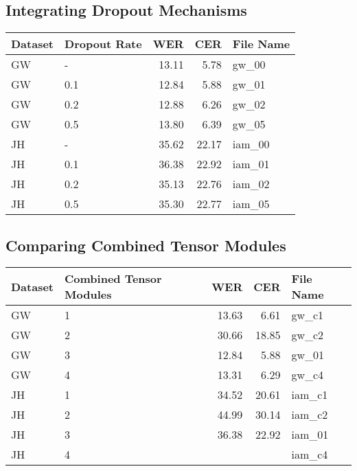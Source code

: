 \subsection{Integrating Dropout Mechanisms}
\label{subsec:5_integrating_dropout_mechanisms}
\begin{tabular}{l|l||r|r|l}
    Dataset	& Dropout Rate	& WER	& CER	& File Name	\\
    \hline
    \hline
    GW		& -		        & 13.11	& 5.78	& gw\_00 \\
    GW		& 0.1	    	& 12.84 & 5.88  & gw\_01 \\
    GW		& 0.2	        & 12.88 & 6.26	& gw\_02 \\
    GW		& 0.5	        & 13.80 & 6.39	& gw\_05 \\
    \hline
    JH		& -		        & 35.62 & 22.17 & iam\_00 \\
    JH		& 0.1		    & 36.38 & 22.92 & iam\_01 \\
    JH		& 0.2	        & 35.13 & 22.76 & iam\_02 \\
    JH		& 0.5	        & 35.30 & 22.77 & iam\_05 \\
    \end{tabular}
\subsection{Comparing Combined Tensor Modules}
\label{subsec:5_comparing_combined_tensor_modules}
\begin{tabular}{l|l||r|r|l}
    Dataset	& Combined Tensor Modules & WER	   & CER   & File Name	\\
    \hline
    \hline
    GW		& 1	                      & 13.63  & 6.61  & gw\_c1 \\
    GW		& 2	                      & 30.66  & 18.85 & gw\_c2 \\
    GW		& 3	                      & 12.84  & 5.88  & gw\_01 \\
    GW		& 4	                      & 13.31  & 6.29  & gw\_c4 \\
    \hline
    JH		& 1	                      & 34.52  & 20.61 & iam\_c1 \\
    JH		& 2		                  & 44.99  & 30.14 & iam\_c2 \\
    JH		& 3	                      & 36.38  & 22.92 & iam\_01 \\
    JH		& 4	                      &        &       & iam\_c4 \\
    \end{tabular}
